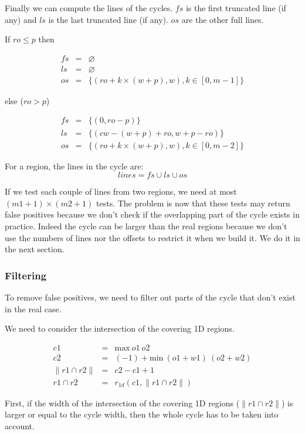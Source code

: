 \documentclass[twocolumn]{article}
\begin{document}
Finally we can compute the lines of the cycles. $fs$ is the first truncated line
(if any) and $ls$ is the last truncated line (if any). $os$ are the other
full lines.

\noindent If $ro \leq p$ then

\[
\begin{array}{rcl}
fs &=& \varnothing\\
ls &=& \varnothing\\
os &=& \{(ro+k\times (w+p), w), k \in [0,m-1]\}
\end{array}
\]

\noindent else ($ro > p$)

\[
\begin{array}{rcl}
fs &=& \{(0, ro-p)\}\\
ls &=& \{(cw-(w+p)+ro, w+p-ro)\}\\
os &=& \{(ro+k\times (w+p), w), k \in [0,m-2]\}
\end{array}
\]

For a region, the lines in the cycle are:
\[ lines = fs \cup ls \cup os \]

If we test each couple of lines from two regions, we need at most $(m1+1) \times
(m2+1)$ tests. The problem is now that these tests may return false positives
because we don't check if the overlapping part of the cycle exists in practice.
Indeed the cycle can be larger than the real regions because we don't use the
numbers of lines nor the offsets to restrict it when we build it. We do it in
the next section.

\subsubsection{Filtering}

To remove false positives, we need to filter out parts of the cycle that don't
exist in the real case.

We need to consider the intersection of the covering 1D regions.

\[
\begin{array}{rcl}
c1               &=& \textrm{max}\ o1\ o2 \\
c2               &=& (-1) + \textrm{min}\ (o1+w1)\ (o2+w2)\\
\| r1 \cap r2 \| &=& c2 - c1 + 1\\
r1 \cap r2       &=& r_{1d}(c1, \| r1 \cap r2 \|)
\end{array}
\]

First, if the width of the intersection of the covering 1D regions ($\| r1 \cap
r2 \|$) is larger or equal to the cycle width, then the whole cycle has to be
taken into account.
\end{document}
